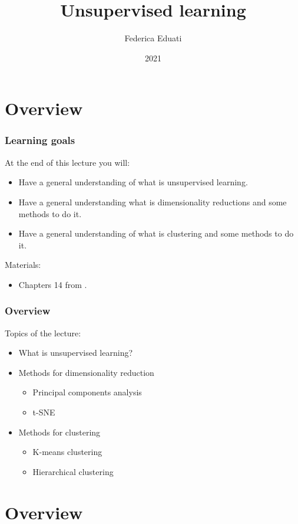 \documentclass[notes]{beamer}          %
\title{Unsupervised learning}
\author{Federica Eduati}
\institute{Eindhoven University of Technology

Department of Biomedical Engineering}
\date{2021}
\begin{document}
 
\frame{\titlepage}
 
\section{Overview}

\begin{frame}
\frametitle{Learning goals}
At the end of this lecture you will:
\begin{itemize}
    \item Have a general understanding of what is unsupervised learning.
    \item Have a general understanding what is dimensionality reductions and some methods to do it.
    \item Have a general understanding of what is clustering and some methods to do it.
\end{itemize}

\vspace{5mm} 

Materials: 
\begin{itemize}
    \item Chapters 14 from \cite{elements}.
\end{itemize}

\end{frame}

\begin{frame}
\frametitle{Overview}
Topics of the lecture:
\begin{itemize}
    \item What is unsupervised learning?
    \item Methods for dimensionality reduction
    \begin{itemize}
    		\item Principal components analysis
    		\item t-SNE
    \end{itemize}
    \item Methods for clustering
    \begin{itemize}
    		\item K-means clustering
    		\item Hierarchical clustering
    	\end{itemize}
\end{itemize}

\vspace{5mm} 


\end{frame}

\section{Overview}
\end{document}
